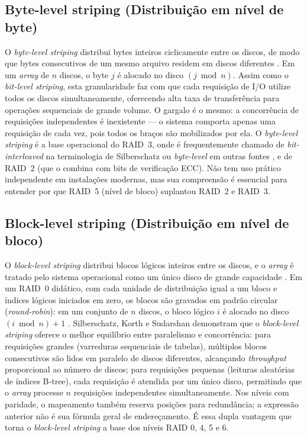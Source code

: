 \documentclass[titlepage]{article}
\begin{document}
\subsection{Byte-level striping (Distribuição em nível de byte)}
O \textit{byte-level striping} distribui bytes inteiros ciclicamente entre os discos, de modo que bytes consecutivos de um mesmo arquivo residem em discos diferentes \cite{silberschatz2020,garciamolina2009}. Em um \textit{array} de $n$ discos, o byte $j$ é alocado no disco $(j \bmod n)$. Assim como o \textit{bit-level striping}, esta granularidade faz com que cada requisição de I/O utilize todos os discos simultaneamente, oferecendo alta taxa de transferência para operações sequenciais de grande volume. O gargalo é o mesmo: a concorrência de requisições independentes é inexistente --- o sistema comporta apenas uma requisição de cada vez, pois todos os braços são mobilizados por ela. O \textit{byte-level striping} é a base operacional do RAID~3, onde é frequentemente chamado de \textit{bit-interleaved} na terminologia de Silberschatz ou \textit{byte-level} em outras fontes \cite{elmasri2016}, e de RAID~2 (que o combina com bits de verificação ECC). Não tem uso prático independente em instalações modernas, mas sua compreensão é essencial para entender por que RAID~5 (nível de bloco) suplantou RAID~2 e RAID~3.

\subsection{Block-level striping (Distribuição em nível de bloco)}
O \textit{block-level striping} distribui blocos lógicos inteiros entre os discos, e o \textit{array} é tratado pelo sistema operacional como um único disco de grande capacidade \cite{silberschatz2020}. Em um RAID~0 didático, com cada unidade de distribuição igual a um bloco e índices lógicos iniciados em zero, os blocos são gravados em padrão circular (\textit{round-robin}): em um conjunto de $n$ discos, o bloco lógico $i$ é alocado no disco $(i \bmod n) + 1$ \cite{silberschatz2020}. Silberschatz, Korth e Sudarshan \cite{silberschatz2020} demonstram que o \textit{block-level striping} oferece o melhor equilíbrio entre paralelismo e concorrência: para requisições grandes (varreduras sequenciais de tabelas), múltiplos blocos consecutivos são lidos em paralelo de discos diferentes, alcançando \textit{throughput} proporcional ao número de discos; para requisições pequenas (leituras aleatórias de índices B-tree), cada requisição é atendida por um único disco, permitindo que o \textit{array} processe $n$ requisições independentes simultaneamente. Nos níveis com paridade, o mapeamento também reserva posições para redundância; a expressão anterior não é sua fórmula geral de endereçamento. É essa dupla vantagem que torna o \textit{block-level striping} a base dos níveis RAID 0, 4, 5 e 6.
\end{document}

